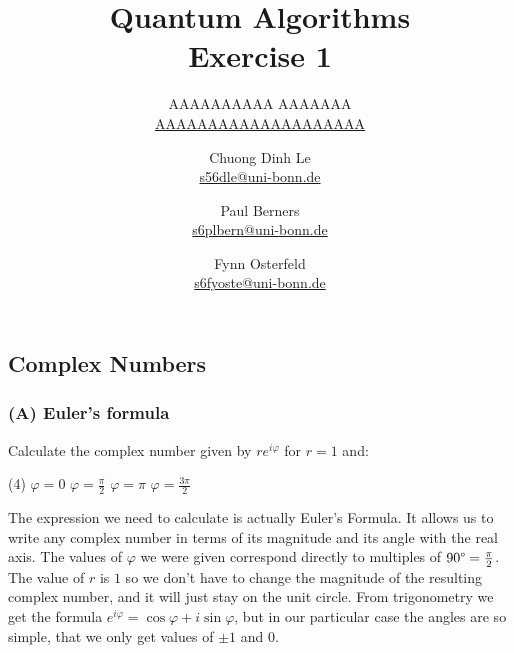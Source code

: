 \documentclass{article}
\title{Quantum Algorithms \\ Exercise 1}
\author{
  AAAAAAAAAA AAAAAAA \\ \href{mailto:AAAAAAAAAAAAAAAAAAAA}{AAAAAAAAAAAAAAAAAAAA} \and
  Chuong Dinh Le \\ \href{mailto:s56dle@uni-bonn.de}{s56dle@uni-bonn.de} \and
  Paul Berners \\ \href{mailto:s6plbern@uni-bonn.de}{s6plbern@uni-bonn.de} \and
  Fynn Osterfeld \\ \href{mailto:s6fyoste@uni-bonn.de}{s6fyoste@uni-bonn.de}
}
\let\phi\varphi
\begin{document}
  \maketitle

  \setcounter{section}{1}
  \subsection{Complex Numbers}
  \subsubsection*{(A) Euler's formula}
  \begin{centerframebox}
    Calculate the complex number given by $re^{i\phi}$ for $r = 1$ and:
    \begin{tasks}[style=itemize](4)
      \task $\phi = 0$
      \task $\phi = \frac{\pi}{2}$
      \task $\phi = \pi$
      \task $\phi = \frac{3\pi}{2}$
    \end{tasks}
  \end{centerframebox}
  \begin{wrapfigure}{r}{4cm}
    \vspace{-.5cm}
    \centering
  \end{wrapfigure}

  The expression we need to calculate is actually Euler's Formula.
  It allows us to write any complex number in terms of its magnitude and its angle with the real axis.
  The values of $\phi$ we were given correspond directly to multiples of $90\degree = \frac{\pi}{2}$.
  The value of $r$ is $1$ so we don't have to change the magnitude of the resulting complex number,
  and it will just stay on the unit circle.
  From trigonometry we get the formula $e^{i\phi} = \cos \phi + i\sin \phi$,
  but in our particular case the angles are so simple, that we only get values of $\pm 1$ and $0$.
\end{document}
